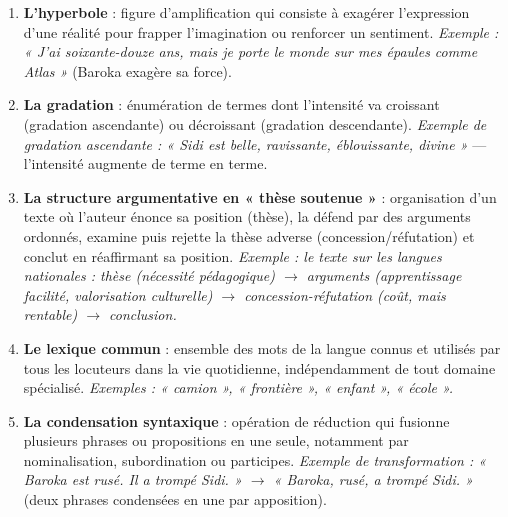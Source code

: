 \documentclass[11pt]{article}
\begin{document}
\begin{corrige}
\begin{enumerate}
    \item \textbf{L'hyperbole} : figure d'amplification qui consiste à exagérer l'expression d'une réalité pour frapper l'imagination ou renforcer un sentiment. \emph{Exemple : « J'ai soixante-douze ans, mais je porte le monde sur mes épaules comme Atlas »} (Baroka exagère sa force).
    \item \textbf{La gradation} : énumération de termes dont l'intensité va croissant (gradation ascendante) ou décroissant (gradation descendante). \emph{Exemple de gradation ascendante : « Sidi est belle, ravissante, éblouissante, divine »} — l'intensité augmente de terme en terme.
    \item \textbf{La structure argumentative en « thèse soutenue »} : organisation d'un texte où l'auteur énonce sa position (thèse), la défend par des arguments ordonnés, examine puis rejette la thèse adverse (concession/réfutation) et conclut en réaffirmant sa position. \emph{Exemple : le texte sur les langues nationales : thèse (nécessité pédagogique) $\rightarrow$ arguments (apprentissage facilité, valorisation culturelle) $\rightarrow$ concession-réfutation (coût, mais rentable) $\rightarrow$ conclusion.}
    \item \textbf{Le lexique commun} : ensemble des mots de la langue connus et utilisés par tous les locuteurs dans la vie quotidienne, indépendamment de tout domaine spécialisé. \emph{Exemples : « camion », « frontière », « enfant », « école ».}
    \item \textbf{La condensation syntaxique} : opération de réduction qui fusionne plusieurs phrases ou propositions en une seule, notamment par nominalisation, subordination ou participes. \emph{Exemple de transformation : « Baroka est rusé. Il a trompé Sidi. » $\rightarrow$ « Baroka, rusé, a trompé Sidi. »} (deux phrases condensées en une par apposition).
\end{enumerate}
\end{corrige}
\end{document}
